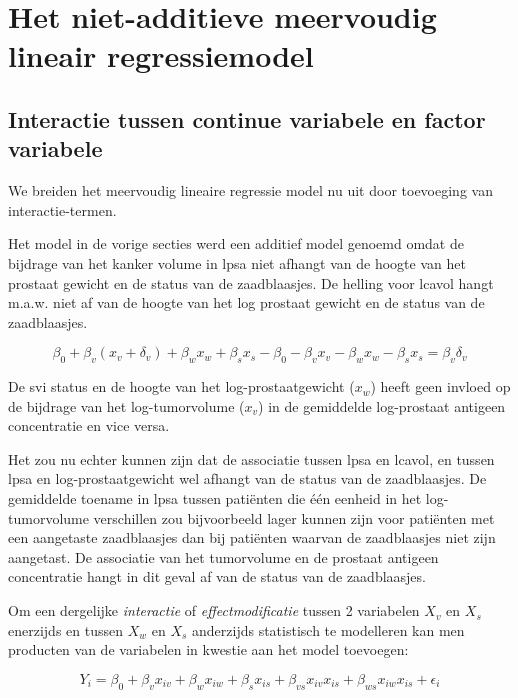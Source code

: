 \documentclass[
  dutch,
  letterpaper,
  12pt]{book}
\theoremstyle{definition}
\theoremstyle{definition}
\theoremstyle{definition}
\theoremstyle{remark}
\begin{document}
\section{Het niet-additieve meervoudig lineair
regressiemodel}\label{het-niet-additieve-meervoudig-lineair-regressiemodel}

\subsection{Interactie tussen continue variabele en factor
variabele}\label{interactie-tussen-continue-variabele-en-factor-variabele}

We breiden het meervoudig lineaire regressie model nu uit door
toevoeging van interactie-termen.

Het model in de vorige secties werd een additief model genoemd omdat de
bijdrage van het kanker volume in lpsa niet afhangt van de hoogte van
het prostaat gewicht en de status van de zaadblaasjes. De helling voor
lcavol hangt m.a.w. niet af van de hoogte van het log prostaat gewicht
en de status van de zaadblaasjes.

\[
\beta_0 + \beta_v (x_{v}+\delta_v) + \beta_w x_{w} +\beta_s x_{s} - \beta_0 - \beta_v x_{v} - \beta_w x_{w} -\beta_s x_s = \beta_v \delta_v
\]

De svi status en de hoogte van het log-prostaatgewicht (\(x_w\)) heeft
geen invloed op de bijdrage van het log-tumorvolume (\(x_v\)) in de
gemiddelde log-prostaat antigeen concentratie en vice versa.

Het zou nu echter kunnen zijn dat de associatie tussen lpsa en lcavol,
en tussen lpsa en log-prostaatgewicht wel afhangt van de status van de
zaadblaasjes. De gemiddelde toename in lpsa tussen patiënten die één
eenheid in het log-tumorvolume verschillen zou bijvoorbeeld lager kunnen
zijn voor patiënten met een aangetaste zaadblaasjes dan bij patiënten
waarvan de zaadblaasjes niet zijn aangetast. De associatie van het
tumorvolume en de prostaat antigeen concentratie hangt in dit geval af
van de status van de zaadblaasjes.

Om een dergelijke \textit{interactie} of \textit{effectmodificatie}
tussen 2 variabelen \(X_v\) en \(X_s\) enerzijds en tussen \(X_w\) en
\(X_s\) anderzijds statistisch te modelleren kan men producten van de
variabelen in kwestie aan het model toevoegen:

\[
Y_i = \beta_0 + \beta_v x_{iv} + \beta_w x_{iw} +\beta_s x_{is} + \beta_{vs} x_{iv}x_{is} + \beta_{ws} x_{iw}x_{is} +\epsilon_i
\]
\end{document}
